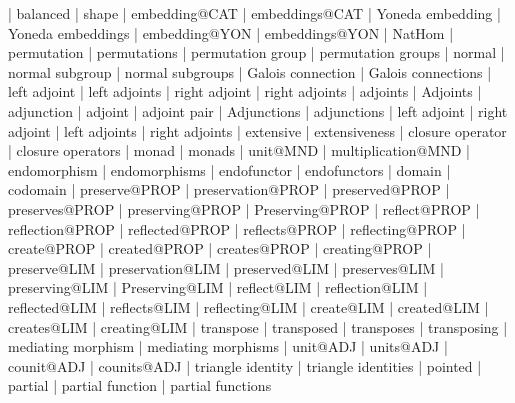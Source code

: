     |   balanced
    |   shape
    |   embedding@CAT
    |   embeddings@CAT
    |   Yoneda embedding
    |   Yoneda embeddings
    |   embedding@YON
    |   embeddings@YON
    |   NatHom
    |   permutation
    |   permutations
    |   permutation group
    |   permutation groups
    |   normal
    |   normal subgroup
    |   normal subgroups
    |   Galois connection
    |   Galois connections
    |   left adjoint
    |   left adjoints
    |   right adjoint
    |   right adjoints
    |   adjoints
    |   Adjoints
    |   adjunction
    |   adjoint
    |   adjoint pair
    |   Adjunctions
    |   adjunctions
    |   left adjoint
    |   right adjoint
    |   left adjoints
    |   right adjoints
    |   extensive
    |   extensiveness
    |   closure operator
    |   closure operators
    |   monad
    |   monads
    |   unit@MND
    |   multiplication@MND
    |   endomorphism
    |   endomorphisms
    |   endofunctor
    |   endofunctors
    |   domain
    |   codomain
    |   preserve@PROP
    |   preservation@PROP
    |   preserved@PROP
    |   preserves@PROP
    |   preserving@PROP
    |   Preserving@PROP
    |   reflect@PROP
    |   reflection@PROP
    |   reflected@PROP
    |   reflects@PROP
    |   reflecting@PROP
    |   create@PROP
    |   created@PROP
    |   creates@PROP
    |   creating@PROP
    |   preserve@LIM
    |   preservation@LIM
    |   preserved@LIM
    |   preserves@LIM
    |   preserving@LIM
    |   Preserving@LIM
    |   reflect@LIM
    |   reflection@LIM
    |   reflected@LIM
    |   reflects@LIM
    |   reflecting@LIM
    |   create@LIM
    |   created@LIM
    |   creates@LIM
    |   creating@LIM
    |   transpose
    |   transposed
    |   transposes
    |   transposing
    |   mediating morphism
    |   mediating morphisms
    |   unit@ADJ
    |   units@ADJ  
    |   counit@ADJ
    |   counits@ADJ
    |   triangle identity
    |   triangle identities
    |   pointed
    |   partial
    |   partial function
    |   partial functions
